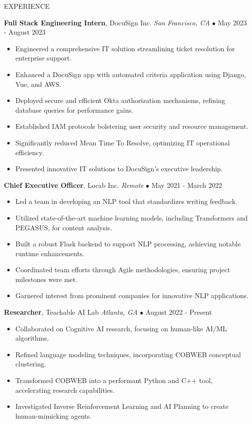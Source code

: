 \documentclass{resume} %
\begin{document}
\begin{rSection}{EXPERIENCE}

\textbf{Full Stack Engineering Intern}, DocuSign Inc. \hfill \textit{San Francisco, CA} $\bullet$ May 2023 - August 2023
\vspace{-2mm}
\begin{itemize}
\itemsep -6pt {}
\item Engineered a comprehensive IT solution streamlining ticket resolution for enterprise support.\n
    \item Enhanced a DocuSign app with automated criteria application using Django, Vue, and AWS.\n
    \item Deployed secure and efficient Okta authorization mechanisms, refining database queries for performance gains.\n
    \item Established IAM protocols bolstering user security and resource management.\n
    \item Significantly reduced Mean Time To Resolve, optimizing IT operational efficiency.\n
    \item Presented innovative IT solutions to DocuSign’s executive leadership.\n\end{itemize}

\vspace{-1mm}

\textbf{Chief Executive Officer}, Locab Inc. \hfill \textit{Remote} $\bullet$ May 2021 - March 2022
\vspace{-2mm}
\begin{itemize}
\itemsep -6pt {}
\item Led a team in developing an NLP tool that standardizes writing feedback.\n
    \item Utilized state-of-the-art machine learning models, including Transformers and PEGASUS, for content analysis.\n
    \item Built a robust Flask backend to support NLP processing, achieving notable runtime enhancements.\n
    \item Coordinated team efforts through Agile methodologies, ensuring project milestones were met.\n
    \item Garnered interest from prominent companies for innovative NLP applications.\n\end{itemize}

\vspace{-1mm}

\textbf{Researcher}, Teachable AI Lab \hfill \textit{Atlanta, GA} $\bullet$ August 2022 - Present
\vspace{-2mm}
\begin{itemize}
\itemsep -6pt {}
\item Collaborated on Cognitive AI research, focusing on human-like AI/ML algorithms.\n
    \item Refined language modeling techniques, incorporating COBWEB conceptual clustering.\n
    \item Transformed COBWEB into a performant Python and C++ tool, accelerating research capabilities.\n
    \item Investigated Inverse Reinforcement Learning and AI Planning to create human-mimicking agents.\n\end{itemize}


\end{rSection}
\end{document}
